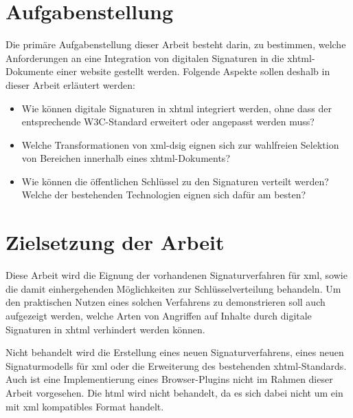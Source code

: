 \section{Aufgabenstellung}
%
\label{sec:Einleitung:aufgabenstellung}
Die primäre Aufgabenstellung dieser Arbeit besteht darin, zu bestimmen, welche Anforderungen an eine Integration von digitalen Signaturen in die
\gls{xhtml}-Dokumente einer \gls{website} gestellt werden. Folgende Aspekte sollen deshalb in dieser Arbeit erläutert werden:
\begin{itemize}
    \item Wie können digitale Signaturen in \gls{xhtml} integriert werden, ohne dass der entsprechende W3C-Standard \cite{xhtml:w3c} erweitert oder angepasst
    werden muss?
    \item Welche Transformationen von \gls{xml-dsig} eignen sich zur wahlfreien Selektion von Bereichen innerhalb eines \gls{xhtml}-Dokuments?
    \item Wie können die öffentlichen Schlüssel zu den Signaturen verteilt werden? Welche der bestehenden Technologien eignen sich dafür am besten?
\end{itemize}

\section{Zielsetzung der Arbeit}
\label{sec:Einleitung:ziele}
Diese Arbeit wird die Eignung der vorhandenen Signaturverfahren für \gls{xml}, sowie die damit einhergehenden Möglichkeiten zur Schlüsselverteilung
behandeln. Um den praktischen Nutzen eines solchen Verfahrens zu demonstrieren soll auch aufgezeigt werden, welche Arten von Angriffen auf Inhalte durch
digitale Signaturen in \gls{xhtml} verhindert werden können.

Nicht behandelt wird die Erstellung eines neuen Signaturverfahrens, eines neuen Signaturmodells für \gls{xml} oder die Erweiterung des bestehenden
\gls{xhtml}-Standards. Auch ist eine Implementierung eines Browser-Plugins nicht im Rahmen dieser Arbeit vorgesehen. Die \gls{html} wird nicht behandelt, da es
sich dabei nicht um ein mit \gls{xml} kompatibles Format handelt.




